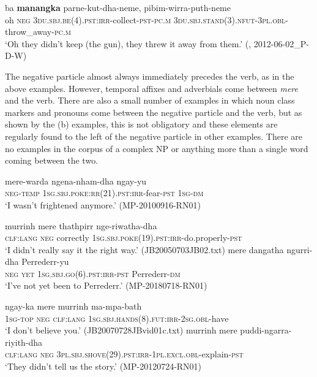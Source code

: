 \documentclass[output=paper,colorlinks,citecolor=brown]{langscibook}
\begin{document}
\ea\label{ex:mur:5} 
    \gll ba \textbf{manangka} parne-kut-dha-neme, pibim-wirra-puth-neme\\
         oh \textsc{neg} \textsc{3du.sbj.be(4).pst:irr}{}-collect-\textsc{pst-pc.m} \textsc{3du.sbj.stand(3).nfut-3pl.obl}{}-throw\_away-\textsc{pc.m}\\
    \glt ‘Oh they didn’t keep (the gun), they threw it away from them.’ (\citealt{MansfieldEtAl2019}, 2012-06-02\_P-D-W)
\z 

The negative particle almost always immediately precedes the verb, as in the above examples. However, temporal affixes  and adverbials  come between \textit{mere} and the verb. There are also a small number of examples in which noun class markers  and pronouns  come between the negative particle and the verb, but as shown by the (b) examples, this is not obligatory and these elements are regularly found to the left of the negative particle in other examples. There are no examples in the corpus of a complex NP or anything more than a single word coming between the two. 

\ea\label{ex:mur:6}
    \gll mere-warda ngena-nham-dha ngay-yu\\
         \textsc{neg-temp} \textsc{1sg.sbj.poke:rr(21).pst:irr}{}-fear-\textsc{pst} \textsc{1sg-dm}\\
    \glt ‘I wasn't frightened anymore.’ (MP-20100916-RN01)
\z

\ea\label{ex:mur:7}
    \ea\label{ex:mur:7a}
        \gll  murrinh mere thathpirr nge-riwatha-dha\\ 
              \textsc{clf:lang} \textsc{neg} correctly \textsc{1sg.sbj.poke(19).pst:irr}{}-do.properly-\textsc{pst}\\
        \glt ‘I didn't really say it the right way.’ (JB20050703JB02.txt)
    \ex\label{ex:mur:7b}
        \gll  mere dangatha ngurri-dha Perrederr-yu\\
              \textsc{neg} \textsc{yet} \textsc{1sg.sbj.go(6).pst:irr-pst} \textsc{P}errederr\textsc{{}-dm} \\
        \glt ‘I’ve not yet been to Perrederr.’ (MP-20180718-RN01)
    \z
\z 

\ea\label{ex:mur:8}
    \ea\label{ex:mur:8a}
        \gll  ngay-ka mere murrinh ma-mpa-bath\\ 
              \textsc{1sg-top} \textsc{neg} \textsc{clf:lang} \textsc{1sg.sbj.hands(8).fut:irr-2sg.obl}{}-have\\
        \glt ‘I don’t believe you.’ (JB20070728JBvid01c.txt)
    \ex\label{ex:mur:8b}
        \gll  murrinh mere puddi-ngarra-riyith-dha \\
              \textsc{clf:lang} \textsc{neg} \textsc{3pl.sbj.shove(29).pst:irr-1pl.excl.obl}{}-explain-\textsc{pst}\\
        \glt ‘They didn't tell us the story.’ (MP-20120724-RN01)
\z
\z 
\end{document}
